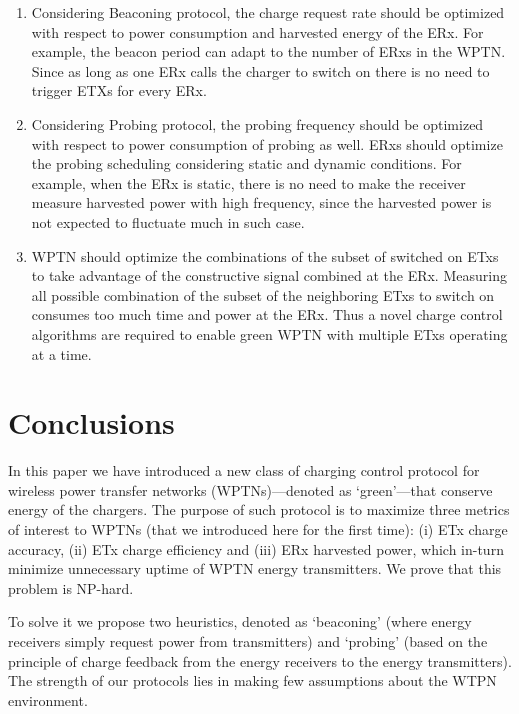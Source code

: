 \documentclass[11pt,draftclsnofoot,journal,onecolumn]{IEEEtran}
\begin{document}
\begin{enumerate}
\item Considering Beaconing protocol, the charge request rate should be optimized with respect to power consumption and harvested energy of the ERx. For example, the beacon period can adapt to the number of ERxs in the WPTN. Since as long as one ERx calls the charger to switch on there is no need to trigger ETXs for every ERx.

\item Considering Probing protocol, the probing frequency should be optimized with respect to power consumption of probing as well. ERxs should optimize the probing scheduling considering static and dynamic conditions. For example, when the ERx is static, there is no need to make the receiver measure harvested power with high frequency, since the harvested power is not expected to fluctuate much in such case.

\item WPTN should optimize the combinations of the subset of switched on ETxs to take advantage of the constructive signal combined at the ERx. Measuring all possible combination of the subset of the neighboring ETxs to switch on consumes too much time and power at the ERx. Thus a novel charge control algorithms are required to enable green WPTN with multiple ETxs operating at a time.

\end{enumerate}

\section{Conclusions}
\label{sec:conclusions}

In this paper we have introduced a new class of charging control protocol for wireless power transfer networks (WPTNs)---denoted as `green'---that conserve energy of the chargers. The purpose of such protocol is to maximize three metrics of interest to WPTNs (that we introduced here for the first time): (i) ETx charge accuracy, (ii) ETx charge efficiency and (iii) ERx harvested power, which in-turn minimize unnecessary uptime of WPTN energy transmitters. We prove that this problem is NP-hard. 

To solve it we propose two heuristics, denoted as `beaconing' (where energy receivers simply request power from transmitters) and `probing' (based on the principle of charge feedback from the energy receivers to the energy transmitters). The strength of our protocols lies in making few assumptions about the WTPN environment.
\end{document}
